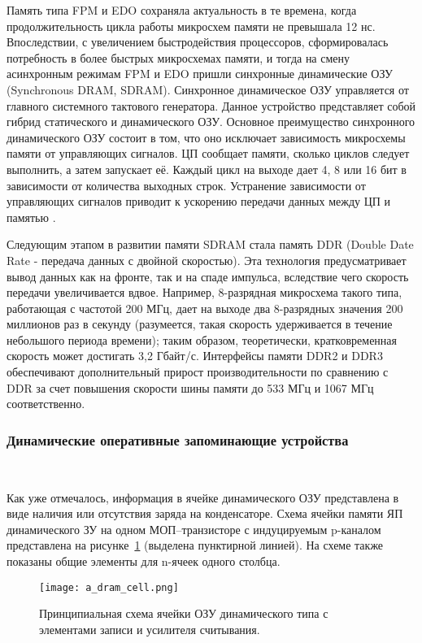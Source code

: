 Память типа FPM и EDO сохраняла актуальность в те времена, когда продолжительность цикла работы микросхем памяти не превышала 12 нс. Впоследствии, с увеличением быстродействия процессоров, сформировалась потребность в более быстрых микросхемах памяти, и тогда на смену асинхронным режимам FPM и EDO пришли синхронные динамические ОЗУ (Synchronous DRAM, SDRAM). Синхронное динамическое ОЗУ управляется от главного системного тактового генератора. Данное устройство представляет собой гибрид статического и динамического ОЗУ. Основное преимущество синхронного динамического ОЗУ состоит в том, что оно исключает зависимость микросхемы памяти от управляющих сигналов. ЦП сообщает памяти, сколько циклов следует выполнить, а затем запускает её. Каждый цикл на выходе дает 4, 8 или 16 бит в зависимости от количества выходных строк. Устранение зависимости от управляющих сигналов приводит к ускорению передачи данных между ЦП и памятью \cite{ibm_dram_article}.

Следующим этапом в развитии памяти SDRAM стала память DDR (Double Date Rate - передача данных с двойной скоростью). Эта технология предусматривает вывод данных как на фронте, так и на спаде импульса, вследствие чего скорость передачи увеличивается вдвое. Например, 8-разрядная микросхема такого типа, работающая с частотой 200 МГц, дает на выходе два 8-разрядных значения 200 миллионов раз в секунду (разумеется, такая скорость удерживается в течение небольшого периода времени); таким образом, теоретически, кратковременная скорость может достигать 3,2 Гбайт/с. Интерфейсы памяти DDR2 и DDR3 обеспечивают дополнительный прирост производительности по сравнению с DDR за счет повышения скорости шины памяти до 533 МГц и 1067 МГц соответственно.

\subsubsection{Динамические оперативные запоминающие устройства}~\\
\label{sub:domain:ram:dram}

Как уже отмечалось, информация в ячейке динамического ОЗУ представлена в виде наличия или отсутствия заряда на конденсаторе. Схема ячейки памяти ЯП динамического ЗУ на одном МОП–транзисторе с индуцируемым p-каналом представлена на рисунке~\ref{fig:domain:ram:dram:dram_cell} (выделена пунктирной линией). На схеме также показаны общие элементы для n-ячеек одного столбца. 


\begin{figure}[ht]
\centering
  \texttt{[image: a\_dram\_cell.png]}  
  \caption{ Принципиальная схема ячейки ОЗУ динамического типа с элементами записи и усилителя считывания. }
  \label{fig:domain:ram:dram:dram_cell}
\end{figure}

